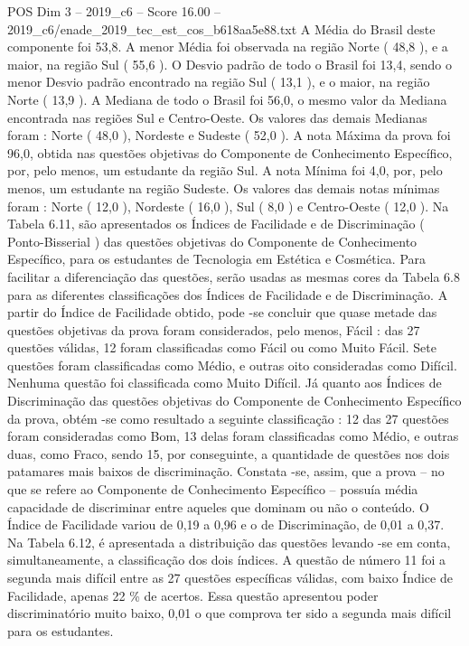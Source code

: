 \begin{textsample}{POS Dim 3 – 2019\_c6 – Score 16.00 – 2019\_c6/enade\_2019\_tec\_est\_cos\_b618aa5e88.txt}
A Média do Brasil deste componente foi 53,8.
A menor Média foi observada na região Norte ( 48,8 ), e a maior, na região Sul ( 55,6 ).
O Desvio padrão de todo o Brasil foi 13,4, sendo o menor Desvio padrão encontrado na região Sul ( 13,1 ), e o maior, na região Norte ( 13,9 ).
A Mediana de todo o Brasil foi 56,0, o mesmo valor da Mediana encontrada nas regiões Sul e Centro-Oeste.
Os valores das demais Medianas foram : Norte ( 48,0 ), Nordeste e Sudeste ( 52,0 ).
A nota Máxima da prova foi 96,0, obtida nas questões objetivas do Componente de Conhecimento Específico, por, pelo menos, um estudante da região Sul.
A nota Mínima foi 4,0, por, pelo menos, um estudante na região Sudeste.
Os valores das demais notas mínimas foram : Norte ( 12,0 ), Nordeste ( 16,0 ), Sul ( 8,0 ) e Centro-Oeste ( 12,0 ).
Na Tabela 6.11, são apresentados os Índices de Facilidade e de Discriminação ( Ponto-Bisserial ) das questões objetivas do Componente de Conhecimento Específico, para os estudantes de Tecnologia em Estética e Cosmética.
Para facilitar a diferenciação das questões, serão usadas as mesmas cores da Tabela 6.8 para as diferentes classificações dos Índices de Facilidade e de Discriminação.
A partir do Índice de Facilidade obtido, pode -se concluir que quase metade das questões objetivas da prova foram considerados, pelo menos, Fácil : das 27 questões válidas, 12 foram classificadas como Fácil ou como Muito Fácil.
Sete questões foram classificadas como Médio, e outras oito consideradas como Difícil.
Nenhuma questão foi classificada como Muito Difícil.
Já quanto aos Índices de Discriminação das questões objetivas do Componente de Conhecimento Específico da prova, obtém -se como resultado a seguinte classificação : 12 das 27 questões foram consideradas como Bom, 13 delas foram classificadas como Médio, e outras duas, como Fraco, sendo 15, por conseguinte, a quantidade de questões nos dois patamares mais baixos de discriminação.
Constata -se, assim, que a prova – no que se refere ao Componente de Conhecimento Específico – possuía média capacidade de discriminar entre aqueles que dominam ou não o conteúdo.
O Índice de Facilidade variou de 0,19 a 0,96 e o de Discriminação, de 0,01 a 0,37.
Na Tabela 6.12, é apresentada a distribuição das questões levando -se em conta, simultaneamente, a classificação dos dois índices.
A questão de número 11 foi a segunda mais difícil entre as 27 questões específicas válidas, com baixo Índice de Facilidade, apenas 22 \% de acertos.
Essa questão apresentou poder discriminatório muito baixo, 0,01 o que comprova ter sido a segunda mais difícil para os estudantes.

\end{textsample}
